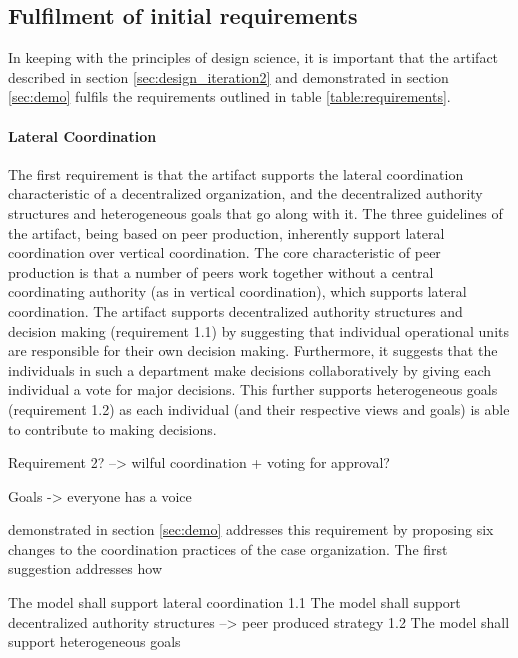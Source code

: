 \subsection{Fulfilment of initial requirements}

In keeping with the principles of design science, it is important that the artifact described in section \ref{sec:design_iteration2} and demonstrated in section \ref{sec:demo} fulfils the requirements outlined in table \ref{table:requirements}. 

\paragraph{Lateral Coordination}

The first requirement is that the artifact supports the lateral coordination characteristic of a decentralized organization, and the decentralized authority structures and heterogeneous goals that go along with it. The three guidelines of the artifact, being based on peer production, inherently support lateral coordination over vertical coordination. The core characteristic of peer production is that a number of peers work together without a central coordinating authority (as in vertical coordination), which supports lateral coordination. The artifact supports decentralized authority structures and decision making (requirement 1.1) by suggesting that individual operational units are responsible for their own decision making. Furthermore, it suggests that the individuals in such a department make decisions collaboratively by giving each individual a vote for major decisions. This further supports heterogeneous goals (requirement 1.2) as each individual (and their respective views and goals) is able to contribute to making decisions.

Requirement 2? --> wilful coordination + voting for approval?


Goals -> everyone has a voice

demonstrated in section \ref{sec:demo} addresses this requirement by proposing six changes to the coordination practices of the case organization. The first suggestion addresses how 
  
The   model  shall  support  lateral coordination
1.1 The model shall support decentralized authority structures  --> peer produced strategy
1.2 The model shall support heterogeneous goals

